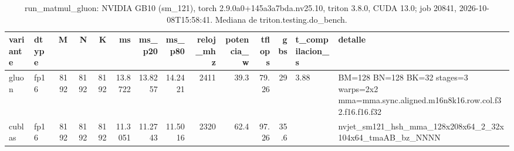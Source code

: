 \begin{table}[htbp]
  \centering\small
  \begin{tabular}{llrrrrrrrrrrll}
    \toprule
    variante & dtype & M & N & K & ms & ms\_p20 & ms\_p80 & reloj\_mhz & potencia\_w & tflops & gbs & t\_compilacion\_s & detalle \\
    \midrule
    gluon & fp16 & 8192 & 8192 & 8192 & 13.8722 & 13.8257 & 14.2421 & 2411 & 39.3 & 79.26 & 29 & 3.88 & BM=128 BN=128 BK=32 stages=3 warps=2x2 mma=mma.sync.aligned.m16n8k16.row.col.f32.f16.f16.f32 \\
    cublas & fp16 & 8192 & 8192 & 8192 & 11.3051 & 11.2743 & 11.5016 & 2320 & 62.4 & 97.26 & 35.6 &  & nvjet\_sm121\_hsh\_mma\_128x208x64\_2\_32x104x64\_tmaAB\_bz\_NNNN \\
    \bottomrule
  \end{tabular}
  \caption{run\_matmul\_gluon: NVIDIA GB10 (sm\_121), torch 2.9.0a0+145a3a7bda.nv25.10, triton 3.8.0, CUDA 13.0; job 20841, 2026-10-08T15:58:41. Mediana de triton.testing.do\_bench.}
  \label{tab:hennessy-frio-run-matmul-gluon}
\end{table}
